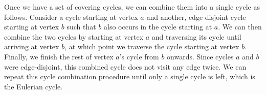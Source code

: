 Once we have a set of covering cycles, we can combine them into a single cycle as follows. Consider a cycle
starting at vertex $a$ and another, edge-disjoint cycle starting at vertex $b$ such that $b$ also occurs
in the cycle starting at $a$. We can then combine the two cycles by starting at vertex $a$ and traversing
its cycle until arriving at vertex $b$, at which point we traverse the cycle starting at vertex $b$. Finally,
we finish the rest of vertex $a$'s cycle from $b$ onwards. Since cycles $a$ and $b$ were edge-disjoint, this
combined cycle does not visit any edge twice. We can repeat this cycle combination procedure until only a
single cycle is left, which is the Eulerian cycle.

